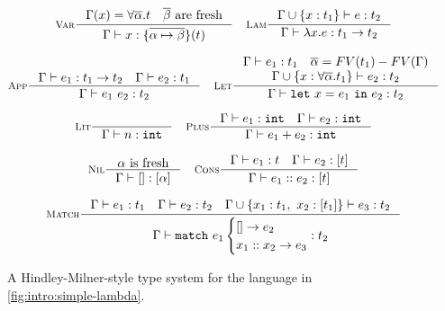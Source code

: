 \begin{figure}[t]
\begin{framed}
\begin{gather*}
\inference[\textsc{Var}]
  {\Gamma(x) = \forall \overline{\alpha}. t
   \quad \overline{\beta} \text{ are fresh}
  }
  {\jtype{\Gamma}{x}{\{\overline{\alpha \mapsto \beta}\}(t)}}
\quad
\inference[\textsc{Lam}]
  {\jtype{\Gamma \cup \{x:t_1\}}{e}{t_2}}
  {\jtype{\Gamma}{\efun{x}{e}}{\tarr{t_1}{t_2}}}
\\[0.1in]
\inference[\textsc{App}]
  {\jtype{\Gamma}{e_1}{\tarr{t_1}{t_2}}
   \quad
   \jtype{\Gamma}{e_2}{t_1}}
  {\jtype{\Gamma}{\eapp{e_1}{e_2}}{t_2}}
\quad
\inference[\textsc{Let}]
  {\jtype{\Gamma}{e_1}{t_1}
   \quad
   \overline{\alpha} = FV(t_1) - FV(\Gamma)
   \\
   \jtype{\Gamma \cup \{x : \forall \overline{\alpha}. t_1\}}{e_2}{t_2}}
  {\jtype{\Gamma}{\elet{x}{e_1}{e_2}}{t_2}}
\\[0.1in]
\inference[\textsc{Lit}]
  {}
  {\jtype{\Gamma}{n}{\tint}}
\quad
\inference[\textsc{Plus}]
  {\jtype{\Gamma}{e_1}{\tint} \quad \jtype{\Gamma}{e_2}{\tint}}
  {\jtype{\Gamma}{\eplus{e_1}{e_2}}{\tint}}
\\[0.1in]
\inference[\textsc{Nil}]
  {\alpha \text{ is fresh}}
  {\jtype{\Gamma}{\enil}{\tlist{\alpha}}}
\quad
\inference[\textsc{Cons}]
  {\jtype{\Gamma}{e_1}{t} \quad \jtype{\Gamma}{e_2}{\tlist{t}}}
  {\jtype{\Gamma}{\econs{e_1}{e_2}}{\tlist{t}}}
\\[0.1in]
\inference[\textsc{Match}]
  {\jtype{\Gamma}{e_1}{t_1}
    \quad
   \jtype{\Gamma}{e_2}{t_2}
    \quad
   \jtype{\Gamma \cup \{x_1:t_1,\ x_2:\tlist{t_1}\}}{e_3}{t_2}
  }
  {\jtype{\Gamma}{\elcase{e_1}{e_2}{x_1}{x_2}{e_3}}{t_2}}
\end{gather*}
\end{framed}
\caption{A Hindley-Milner-style type system for the language in \autoref{fig:intro:simple-lambda}.
}
\label{fig:intro:hindley-milner}
\end{figure}

